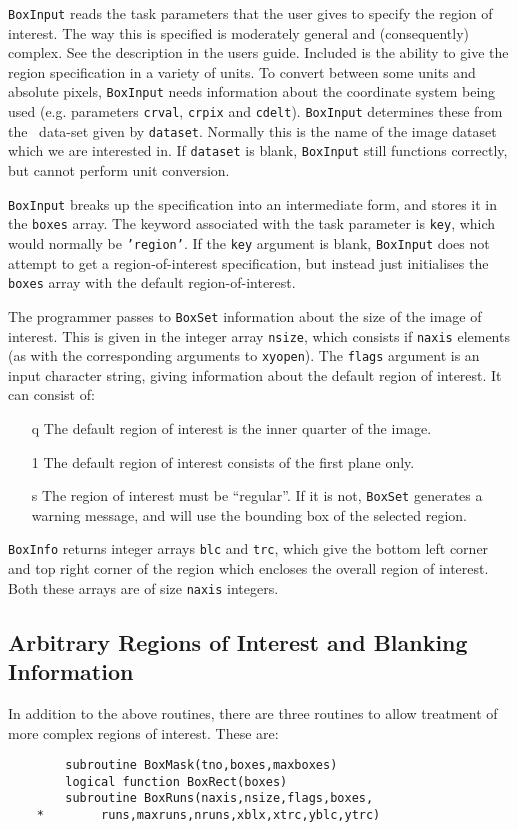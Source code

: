 {\tt BoxInput} reads the task parameters that the user gives to
specify the region of interest. The way this is specified is moderately
general and (consequently) complex. See the description in the users guide.
Included is the ability to give the region specification in a variety of
units. To convert between some units and absolute pixels, {\tt BoxInput}
needs information about the coordinate system being used (e.g.
parameters {\tt crval}, {\tt crpix} and {\tt cdelt}). {\tt BoxInput} determines
these from the \miriad\ data-set given by {\tt dataset}. Normally this is the name
of the image dataset which we are interested in. If {\tt dataset} is
blank, {\tt BoxInput} still functions correctly, but cannot perform unit
conversion.

{\tt BoxInput} breaks up the specification into an intermediate form, and
stores it in the {\tt boxes} array.
The keyword associated with the task parameter is {\tt key},
which would normally be {\tt 'region'}. If the {\tt key} argument is blank,
{\tt BoxInput} does not attempt to get a region-of-interest specification,
but instead just initialises the {\tt boxes} array with the default
region-of-interest.

The programmer passes to {\tt BoxSet} information about the size of the image
of interest. This is given in the integer array {\tt nsize}, which consists
if {\tt naxis} elements (as with the corresponding arguments to {\tt xyopen}).
The {\tt flags} argument is an input character string, giving information
about the default region of interest. It can consist of:
\begin{itemize}
\item[q] The default region of interest is the inner quarter of the image.
\item[1] The default region of interest consists of the first plane only.
\item[s] The region of interest must be ``regular''. If it is not, {\tt BoxSet}
generates a warning message, and will use the bounding box of the selected
region.
\end{itemize}

{\tt BoxInfo} returns integer arrays {\tt blc} and {\tt trc}, which give the
bottom
left corner and top right corner of the region which encloses the overall
region of interest. Both these arrays are of size {\tt naxis} integers.

\subsection{Arbitrary Regions of Interest and Blanking Information}
In addition to the above routines, there are three routines to allow treatment
of more complex regions of interest. These are:
\begin{verbatim}
        subroutine BoxMask(tno,boxes,maxboxes)
        logical function BoxRect(boxes)
        subroutine BoxRuns(naxis,nsize,flags,boxes,
    *        runs,maxruns,nruns,xblx,xtrc,yblc,ytrc)
\end{verbatim}

